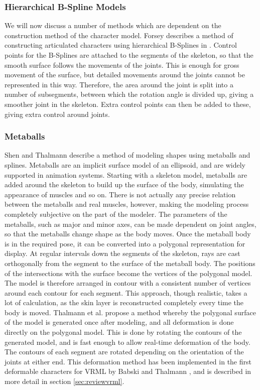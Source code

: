 \documentclass[10pt,oneside,fleqn,a4paper]{book}
\begin{document}
\subsubsection{Hierarchical B-Spline Models}
We will now discuss a number of methods which are dependent on the construction method of the character model. Forsey describes a method of constructing articulated characters using hierarchical B-Splines in \cite{Forsey91}. Control points for the B-Splines are attached to the segments of the skeleton, so that the smooth surface follows the movements of the joints. This is enough for gross movement of the surface, but detailed movements around the joints cannot be represented in this way. Therefore, the area around the joint is split into a number of subsegments, between which the rotation angle is divided up, giving a smoother joint in the skeleton. Extra control points can then be added to these, giving extra control around joints.

\subsubsection{Metaballs}
Shen and Thalmann \cite{Shen95} describe a method of modeling shapes using metaballs and splines. Metaballs are an implicit surface model of an ellipsoid, and are widely supported in animation systems. Starting with a skeleton model, metaballs are added around the skeleton to build up the surface of the body, simulating the appearance of muscles and so on. There is not actually any precise relation between the metaballs and real muscles, however, making the modeling process completely subjective on the part of the modeler. The parameters of the metaballs, such as major and minor axes, can be made dependent on joint angles, so that the metaballs change shape as the body moves. Once the metaball body is in the required pose, it can be converted into a polygonal representation for display. At regular intervals down the segments of the skeleton, rays are cast orthogonally from the segment to the surface of the metaball body. The positions of the intersections with the surface become the vertices of the polygonal model. The model is therefore arranged in contour with a consistent number of vertices around each contour for each segment. 
This approach, though realistic, takes a lot of calculation, as the skin layer is reconstructed completely every time the body is moved. Thalmann et al. \cite{Thalmann96} propose a method whereby the polygonal surface of the model is generated once after modeling, and all deformation is done directly on the polygonal model. This is done by rotating the contours of the generated model, and is fast enough to allow real-time deformation of the body. The contours of each segment are rotated depending on the orientation of the joints at either end. This deformation method has been implemented in the first deformable characters for VRML by Babski and Thalmann \cite{Babski99}, and is described in more detail in section \ref{sec:reviewvrml}.
\end{document}
